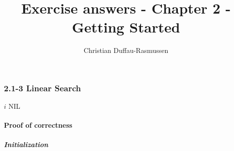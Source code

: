 \documentclass{article}
\title{Exercise answers - Chapter 2 - Getting Started}
\author{Christian Duffau-Rasmussen}
\let\oldReturn\Return
\renewcommand{\Return}{\State\oldReturn}
\begin{document}
\subsubsection*{2.1-3 Linear Search}

\begin{algorithmic}[1]
\Return $i$
\EndIf
\EndFor
\Return NIL
\EndProcedure
\end{algorithmic}

\paragraph{Proof of correctness}
\subparagraph{Initialization}
\end{document}
